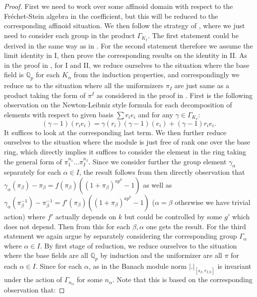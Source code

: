 \documentclass[12pt]{amsart}
\theoremstyle{definition}
\numberwithin{equation}{section}
\begin{document}
\begin{proof}
First we need to work over some affinoid domain with respect to the Fr\'echet-Stein algebra in the coefficient, but this will be reduced to the corresponding affinoid situation. We then follow the strategy of \cite[Proposition 2.2.14]{KPX}, where we just need to consider each group in the product $\Gamma_{K_I}$. The first statement could be derived in the same way as in \cite[Proposition 2.2.14]{KPX}. For the second statement therefore we assume the limit identity in I, then prove the corresponding results on the identity in II. As in the proof in \cite[Proposition 2.2.14]{KPX}, for I and II, we reduce ourselves to the situation where the base field is $\mathbb{Q}_p$ for each $K_\alpha$ from the induction properties, and correspondingly we reduce us to the situation where all the uniformizers $\pi_I$ are just same as a product taking the form of $\pi^I$ as considered in the proof in \cite[Proposition 2.2.14]{KPX}. First is the following observation on the Newton-Leibniz style formula for each decomposition of elements with respect to given basis $\sum r_i e_i$ and for any $\gamma\in \Gamma_{K_I}$:
\begin{displaymath}
(\gamma-1)(r_i e_i)=\gamma(r_i)	(\gamma-1)(e_i)+(\gamma-1)r_i e_i.
\end{displaymath}
It suffices to look at the corresponding last term. We then further reduce ourselves to the situation where the module is just free of rank one over the base ring, which directly implies it suffices to consider the element in the ring taking the general form of $\pi_1^{n_1}...\pi_I^{n_I}$. Since we consider further the group element $\gamma_\alpha$ separately for each $\alpha\in I$, the result follows from then directly observation that $\gamma_\alpha(\pi_\beta)-\pi_\beta=f(\pi_\beta)((1+\pi_\beta)^{ap^k}-1)$ as well as $\gamma_\alpha(\pi_\beta^{-1})-\pi_\beta^{-1}=f'(\pi_\beta)((1+\pi_\beta)^{ap^k}-1)$ ($\alpha=\beta$ otherwise we have trivial action) where $f'$ actually depends on $k$ but could be controlled by some $g'$ which does not depend. Then from this for each $\beta,\alpha$ one gets the result. For the third statement we again argue by separately considering the corresponding group $\Gamma_\alpha$ where $\alpha\in I$. By first stage of reduction, we reduce ourselves to the situation where the base fields are all $\mathbb{Q}_p$ by induction and the uniformizer are all $\pi$ for each $\alpha \in I$. Since for each $\alpha$, as in \cite[Proposition 2.2.14]{KPX} the Banach module norm $|.|_{[s_I,r_{I,0}]}$ is invariant under the action of $\Gamma_{n_\alpha}$ for some $n_\alpha$. Note that this is based on the corresponding observation that:

\end{proof}
\end{document}
